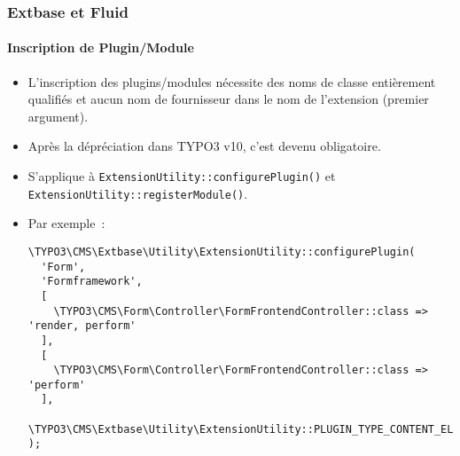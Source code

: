 %

\begin{frame}[fragile]
	\frametitle{Extbase et Fluid}
	\framesubtitle{Inscription de Plugin/Module}

	\lstset{basicstyle=\tiny\ttfamily}

	\begin{itemize}
		\item L'inscription des plugins/modules nécessite des noms de classe entièrement qualifiés
			et aucun nom de fournisseur dans le nom de l'extension (premier argument).
		\item Après la dépréciation dans TYPO3 v10, c'est devenu obligatoire.
		\item S'applique à
			\small\texttt{ExtensionUtility::configurePlugin()}\normalsize
			et
			\small\texttt{ExtensionUtility::registerModule()}.
		\item Par exemple~:
\begin{lstlisting}
\TYPO3\CMS\Extbase\Utility\ExtensionUtility::configurePlugin(
  'Form',
  'Formframework',
  [
    \TYPO3\CMS\Form\Controller\FormFrontendController::class => 'render, perform'
  ],
  [
    \TYPO3\CMS\Form\Controller\FormFrontendController::class => 'perform'
  ],
  \TYPO3\CMS\Extbase\Utility\ExtensionUtility::PLUGIN_TYPE_CONTENT_ELEMENT
);
\end{lstlisting}

	\end{itemize}

\end{frame}

